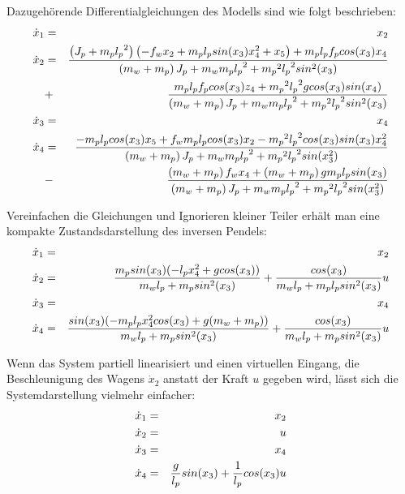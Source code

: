 \begin{beispiel}
	Dazugehörende Differentialgleichungen des Modells sind wie folgt beschrieben\cite{TUM}\cite{MAMoh}:
	\begin{eqnarray}
	\dot{x}_{1}&=&x_{2}\notag\\
	\dot{x}_{2}&=&\frac{\left ( J_{p}+m_{p}{l_{p}}^{2} \right )\left ( -f_{w}x_{2}+m_{p}l_{p}sin(x_{3})x_{4}^{2}+x_{5}\right )+m_{p}l_{p}f_{p}cos(x_{3})x_{4}}{\left ( m_{w}+m_{p} \right )J_{p}+m_{w}m_{p}{l_{p}}^{2}+{m_{p}}^{2}{l_{p}}^{2}sin^{2}(x_{3})}\notag\\&+&\frac{m_{p}l_{p}f_{p}cos(x_{3})z_{4}+{m_{p}}^{2}{l_{p}}^{2}gcos(x_{3})sin(x_{4})}{\left ( m_{w}+m_{p} \right )J_{p}+m_{w}m_{p}{l_{p}}^{2}+{m_{p}}^{2}{l_{p}}^{2}sin^{2}(x_{3})}\notag
	\\
	\dot{x}_{3}&=&x_{4}\notag\\
	\dot{x}_{4}&=&\frac{-m_{p}l_{p}cos(x_{3})x_{5}+f_{w}m_{p}l_{p}cos(x_{3})x_{2}- {m_{p}}^{2}{l_{p}}^{2}cos(x_{3})sin(x_{3})x_{4}^{2}}{\left ( m_{w}+m_{p} \right )J_{p}+m_{w}m_{p}{l_{p}}^{2}+{m_{p}}^{2}{l_{p}}^{2}sin(x_{3}^{2})}\notag\\&-&\frac{\left ( m_{w}+m_{p} \right )f_{w}x_{4}+\left ( m_{w}+m_{p} \right )gm_{p}l_{p}sin(x_{3})}{\left ( m_{w}+m_{p} \right )J_{p}+m_{w}m_{p}{l_{p}}^{2}+{m_{p}}^{2}{l_{p}}^{2}sin(x_{3}^{2})}\label{eq:DLG_Inverses_Pendel}  
	\end{eqnarray}
	
	Vereinfachen die Gleichungen und Ignorieren kleiner Teiler erhält man eine kompakte Zustandsdarstellung des inversen Pendels\cite{kunze2016pytrajectory}:
	\begin{eqnarray}
	\dot{x}_{1}&=&x_{2}\notag\\
	\dot{x}_{2}&=&\frac{m_{p}sin(x_{3})(-l_{p}x_{4}^{2}+gcos(x_{3}))}{m_{w}l_{p}+m_{p}sin^{2}(x_{3})}+\frac{cos(x_{3})}{m_{w}l_{p}+m_{p}l_{p}sin^{2}(x_{3})}u\notag\\
	\dot{x}_{3}&=&x_{4}\notag\\
	\dot{x}_{4}&=&\frac{sin(x_{3})(-m_{p}l_{p}x_{4}^{2}cos(x_{3})+g(m_{w}+m_{p}))}{m_{w}l_{p}+m_{p}sin^{2}(x_{3})}+\frac{cos(x_{3})}{m_{w}l_{p}+m_{p}sin^{2}(x_{3})}u\label{eq:DLG_Inverses_Pendel_compact}   
	\end{eqnarray}
	
	Wenn das System partiell linearisiert und einen virtuellen Eingang, die Beschleunigung des Wagens $\dot{x}_{2}$ anstatt der Kraft $u$ gegeben wird, lässt sich die Systemdarstellung vielmehr einfacher:
	\begin{eqnarray}
	\dot{x}_{1}&=&x_{2}\notag\\
	\dot{x}_{2}&=&u\notag\\
	\dot{x}_{3}&=&x_{4}\notag\\
	\dot{x}_{4}&=&\frac{g}{l_{p}}sin(x_{3})+\frac{1}{l_{p}}cos(x_{3})u\label{eq:DLG_Inverses_Pendel_partiell_lin}   
	\end{eqnarray}
	

\end{beispiel}
